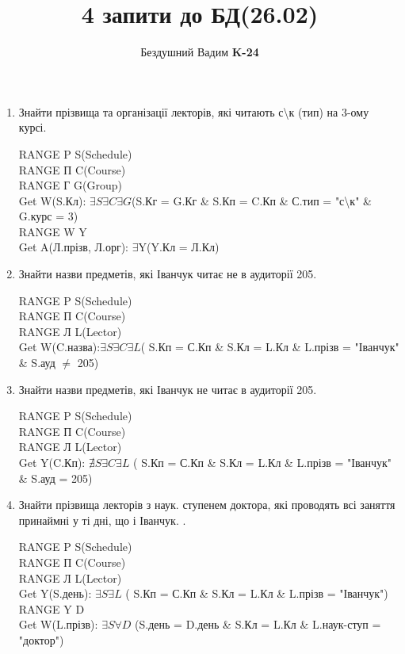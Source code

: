 \documentclass[a4paper, 12pt]{article}
\title{4 запити до БД(26.02)}
\author{Бездушний Вадим \textbf{K-24}}
\date{}
\begin{document}
\maketitle
\begin{enumerate}
\item{Знайти прізвища та організації лекторів, які читають с\textbackslash к (тип) на 3-ому курсі.
\begin{test-answer}
	RANGE P S(Schedule)\\
	RANGE П C(Course)\\
	RANGE Г G(Group)\\
	Get W(S.Кл): $\exists S \exists C \exists G$(S.Кг = G.Кг \& S.Кп = C.Кп \& С.тип = "с\textbackslash к" \& G.курс = 3)\\
	RANGE W Y\\
	Get A(Л.прізв, Л.орг): $\exists$Y(Y.Кл = Л.Кл)\\
\end{test-answer}
}
\item{Знайти назви предметів, які Іванчук читає не в аудиторії 205.
\begin{test-answer}
	RANGE P S(Schedule)\\
	RANGE П C(Course)\\
	RANGE Л L(Lector)\\
	Get W(C.назва):$\exists S \exists C \exists L$( S.Кп = С.Кп \& S.Кл = L.Кл \& L.прізв = "Іванчук" \& S.ауд $\neq$ 205)\\
\end{test-answer}
}

\item{Знайти назви предметів, які Іванчук не читає в аудиторії 205.
\begin{test-answer}
	RANGE P S(Schedule)\\
	RANGE П C(Course)\\
	RANGE Л L(Lector)\\
	Get Y(C.Кп): $\nexists S \exists C \exists L$
	( S.Кп = С.Кп \& S.Кл = L.Кл \& L.прізв = "Іванчук" \& S.ауд = 205)\\	
\end{test-answer}
}

\item{Знайти прізвища лекторів з наук. ступенем доктора, які проводять всі заняття принаймні у ті дні, що і Іванчук. .
\begin{test-answer}
	RANGE P S(Schedule)\\
	RANGE П C(Course)\\
	RANGE Л L(Lector)\\
	Get Y(S.день): $\exists S \exists L$ ( S.Кп = С.Кп \& S.Кл = L.Кл \& L.прізв = "Іванчук")\\	
	RANGE Y D\\
	Get W(L.прізв): $\exists S \forall D$ (S.день = D.день \& S.Кл = L.Кл \& L.наук-ступ = "доктор")
\end{test-answer}

}

\end{enumerate}
\end{document}
